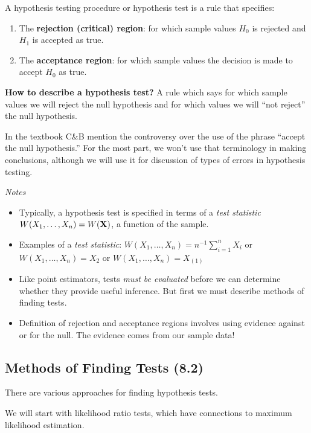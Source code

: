 \documentclass[11pt,]{article}
\providecommand{\tightlist}{%
  \setlength{\itemsep}{0pt}\setlength{\parskip}{0pt}}
\def\bX{{\bf X}}
\def\ninv{n^{-1}}
\def\sumin{\sum_{i=1}^n}
\begin{document}
 A hypothesis testing procedure or
hypothesis test is a rule that specifies:

\begin{enumerate}
\item The {\bf rejection (critical) region}: for which sample values $H_0$ is rejected and $H_1$ is accepted as true.
\item The {\bf acceptance region}: for which sample values the decision is made to accept $H_0$ as true.
\end{enumerate}

\textbf{How to describe a hypothesis test?} A rule which says for which
sample values we will reject the null hypothesis and for which values we
will ``not reject'' the null hypothesis.

In the textbook C\&B mention the controversy over the use of the phrase
``accept the null hypothesis.'' For the most part, we won't use that
terminology in making conclusions, although we will use it for
discussion of types of errors in hypothesis testing.

\emph{Notes}

\begin{itemize}
\tightlist
\item
  Typically, a hypothesis test is specified in terms of a \emph{test
  statistic} \(W(X_1, \ldots, X_n) = W(\bX)\), a function of the sample.
\item
  Examples of a \emph{test statistic}:
  \(W(X_1, \ldots, X_n) = \ninv\sumin{X_i}\) or
  \(W(X_1, \ldots, X_n) = X_2\) or \(W(X_1, \ldots, X_n) = X_{(1)}\)
\item
  Like point estimators, tests \emph{must be evaluated} before we can
  determine whether they provide useful inference. But first we must
  describe methods of finding tests.
\item
  Definition of rejection and acceptance regions involves using evidence
  against or for the null. The evidence comes from our sample data!
\end{itemize}

\hypertarget{methods-of-finding-tests-8.2}{%
\subsection{Methods of Finding Tests
(8.2)}\label{methods-of-finding-tests-8.2}}

There are various approaches for finding hypothesis tests.

We will start with likelihood ratio tests, which have connections to
maximum likelihood estimation.
\end{document}
